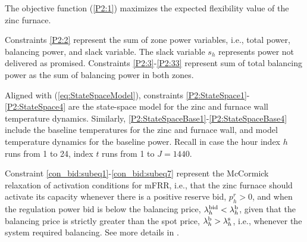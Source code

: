 \documentclass[conference]{IEEEtran}
\begin{document}
{The objective function (\ref{P2:1}) maximizes the expected flexibility value of the zinc furnace.
%

Constraints \eqref{P2:2} represent the sum of zone power variables, i.e., total power, balancing power, and slack variable. The slack variable $s_h$ represents power not delivered as promised. Constraints \eqref{P2:3}-\eqref{P2:33} represent sum of total balancing power as the sum of balancing power in both zones.

Aligned with (\ref{eq:StateSpaceModel}), constraints \eqref{P2:StateSpace1}-\eqref{P2:StateSpace4} are the state-space model for the zinc and furnace wall temperature dynamics. Similarly, \eqref{P2:StateSpaceBase1}-\eqref{P2:StateSpaceBase4} include the baseline temperatures for the zinc and furnace wall, and model temperature dynamics for the baseline power. %
Recall in case the hour index $h$ runs from 1 to 24, index $t$ runs from 1 to $J=1440$.

Constraint \eqref{con_bid:subeq1}-\eqref{con_bid:subeq7} represent the McCormick relaxation of activation conditions for mFRR, i.e., that the zinc furnace should activate its capacity whenever there is a positive reserve bid, $p^{r}_{h} > 0$, and when the regulation power bid is below the balancing price, $\lambda_{h}^{\rm{bid}} < \lambda_{h}^{\rm{b}}$, given that the balancing price is strictly greater than the spot price, $\lambda_{h}^{\rm{b}} > \lambda_{h}^{\rm{s}}$, i.e., whenever the system required balancing. See more details in \cite{gade2023load}.

}
\end{document}
